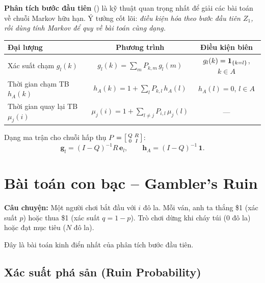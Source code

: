 \begin{tomtat}
\textbf{Phân tích bước đầu tiên} () là kỹ thuật quan trọng nhất
để giải các bài toán về chuỗi Markov hữu hạn. Ý tưởng cốt lõi:
\emph{điều kiện hóa theo bước đầu tiên $Z_1$, rồi dùng tính Markov để quy về bài toán cùng dạng.}

\medskip
\begin{center}
\renewcommand{\arraystretch}{1.5}
\begin{tabular}{|l|c|c|}
\hline
\textbf{Đại lượng} & \textbf{Phương trình} & \textbf{Điều kiện biên} \\
\hline
Xác suất chạm $g_l(k)$ &
$g_l(k) = \displaystyle\sum_m P_{k,m}\, g_l(m)$ &
$g_l(k) = \mathbf{1}_{\{k=l\}}$, $k \in A$ \\
\hline
Thời gian chạm TB $h_A(k)$ &
$h_A(k) = 1 + \displaystyle\sum_l P_{k,l}\, h_A(l)$ &
$h_A(l) = 0$, $l \in A$ \\
\hline
Thời gian quay lại TB $\mu_j(i)$ &
$\mu_j(i) = 1 + \displaystyle\sum_{l \neq j} P_{i,l}\, \mu_j(l)$ &
--- \\
\hline
\end{tabular}
\end{center}

\medskip
Dạng ma trận cho chuỗi hấp thụ $P = \begin{bsmallmatrix} Q & R \\ 0 & I \end{bsmallmatrix}$:
\[
  \mathbf{g}_l = (I-Q)^{-1} R\, \mathbf{e}_l, \qquad
  \mathbf{h}_A = (I-Q)^{-1}\, \mathbf{1}.
\]
\end{tomtat}

\section{Bài toán con bạc -- Gambler's Ruin}
\label{sec:gamblers-ruin}

\textbf{Câu chuyện:} Một người chơi bắt đầu với $i$ đô la. Mỗi ván, anh ta thắng \$1 (xác suất $p$)
hoặc thua \$1 (xác suất $q = 1-p$). Trò chơi dừng khi cháy túi ($0$ đô la) hoặc đạt mục tiêu ($N$ đô la).

Đây là bài toán kinh điển nhất của phân tích bước đầu tiên.

\subsection{Xác suất phá sản (Ruin Probability)}

